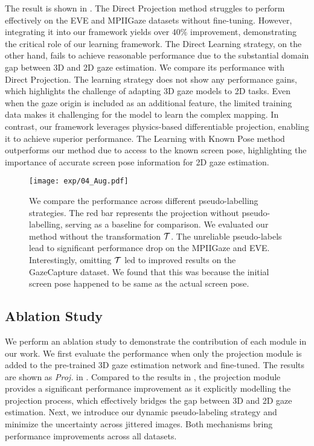 The result is shown in . 
The Direct Projection method struggles to perform effectively on the EVE and MPIIGaze datasets without fine-tuning. However, integrating it into our framework yields over $40\%$ improvement, demonstrating the critical role of our learning framework.
The Direct Learning strategy, on the other hand, fails to achieve reasonable performance due to the substantial domain gap between 3D and 2D gaze estimation. 
We compare its performance with Direct Projection. The learning strategy does not show any performance gains, which highlights the challenge of adapting 3D gaze models to 2D tasks.
Even when the gaze origin is included as an additional feature, the limited training data makes it challenging for the model to learn the complex mapping. In contrast, our framework leverages physics-based differentiable projection, enabling it to achieve superior performance.
The Learning with Known Pose method outperforms our method due to access to the known screen pose, highlighting the importance of accurate screen pose information for 2D gaze estimation.



\begin{figure}[t]
	\begin{center}
		\texttt{[image: exp/04\_Aug.pdf]}	
	\end{center}
    \vspace{-4mm}
	\caption{We compare the performance across different pseudo-labelling strategies. The red bar represents the projection without pseudo-labelling, serving as a baseline for comparison. We evaluated our method without the transformation $\mathcal{T}$. The unreliable pseudo-labels lead to significant performance drop on the MPIIGaze and EVE. Interestingly, omitting $\mathcal{T}$ led to improved results on the GazeCapture dataset. We found that this was because the initial screen pose happened to be same as the actual screen pose. \vspace{-4mm}}
	\label{fig:plcom}
\end{figure}

\subsection{Ablation Study}
We perform an ablation study to demonstrate the contribution of each module in our work. We first evaluate the performance when only the projection module is added to the pre-trained 3D gaze estimation network and fine-tuned. The results are shown as \textit{Proj.} in . Compared to the results in , the projection module provides a significant performance improvement as it explicitly modelling the projection process, which effectively bridges the gap between 3D and 2D gaze estimation.
Next, we introduce our dynamic pseudo-labeling strategy and minimize the uncertainty across jittered images. Both mechanisms bring performance improvements across all datasets.

